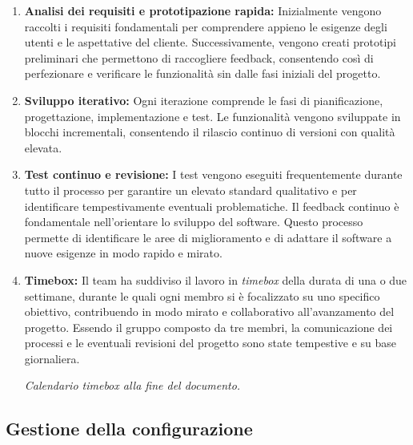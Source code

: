 \documentclass[a4paper,12pt]{article}
\begin{document}
\begin{enumerate}
    \item \textbf{Analisi dei requisiti e prototipazione rapida:}  
    Inizialmente vengono raccolti i requisiti fondamentali per comprendere appieno le esigenze degli utenti e le aspettative del cliente.  
    Successivamente, vengono creati prototipi preliminari che permettono di raccogliere feedback, consentendo così di perfezionare e verificare le funzionalità sin dalle fasi iniziali del progetto.

    \item \textbf{Sviluppo iterativo:}  
    Ogni iterazione comprende le fasi di pianificazione, progettazione, implementazione e test.  
    Le funzionalità vengono sviluppate in blocchi incrementali, consentendo il rilascio continuo di versioni con qualità elevata.

    \item \textbf{Test continuo e revisione:}  
    I test vengono eseguiti frequentemente durante tutto il processo per garantire un elevato standard qualitativo e per identificare tempestivamente eventuali problematiche.  
    Il feedback continuo è fondamentale nell'orientare lo sviluppo del software. Questo processo permette di identificare le aree di miglioramento e di adattare il software a nuove esigenze in modo rapido e mirato.

    \item \textbf{Timebox:}  
    Il team ha suddiviso il lavoro in \emph{timebox} della durata di una o due settimane, durante le quali ogni membro si è focalizzato su uno specifico obiettivo, contribuendo in modo mirato e collaborativo all’avanzamento del progetto.  
    Essendo il gruppo composto da tre membri, la comunicazione dei processi e le eventuali revisioni del progetto sono state tempestive e su base giornaliera.  

    \textit{Calendario timebox alla fine del documento.}
\end{enumerate}

\subsection{Gestione della configurazione}
\end{document}
